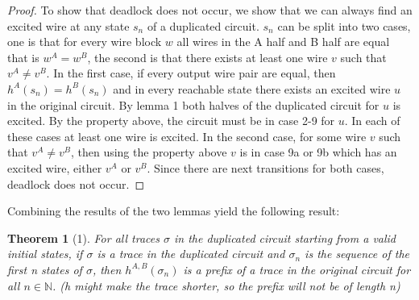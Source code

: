 \documentclass{article}
\newtheorem*{theorem}{Theorem}
\begin{document}
\begin{proof}
To show that deadlock does not occur, we show that we can always find an excited wire at any state $s_n$ of a duplicated circuit.  $s_n$ can be split into two cases, one is that for every wire block $w$ all wires in the A half and B half are equal that is $w^A=w^B$, the second is that there exists at least one wire $v$ such that $v^A\neq v^B$.  In the first case, if every output wire pair are equal, then $h^A(s_n)=h^B(s_n)$ and in every reachable state there exists an excited wire $u$ in the original circuit.  By lemma 1 both halves of the duplicated circuit for $u$ is excited.  By the property above, the circuit must be in case 2-9 for $u$.  In each of these cases at least one wire is excited.  \newline
In the second case, for some wire $v$ such that $v^A\neq v^B$, then using the property above $v$ is in case 9a or 9b which has an excited wire, either $v^A$ or $v^B$.  Since there are next transitions for both cases, deadlock does not occur.
\end{proof}


Combining the results of the two lemmas yield the following result:
\begin{theorem}[1]
For all traces $\sigma$ in the duplicated circuit starting from a valid initial states, if $\sigma$ is a trace in the duplicated circuit and $\sigma_n$ is the sequence of the first n states of $\sigma$, then $h^{A,B}(\sigma_n)$ is a prefix of a trace in the original circuit for all $n \in \mathbb{N}$.  (h might make the trace shorter, so the prefix will not be of length n)
\end{theorem}

\end{document}
